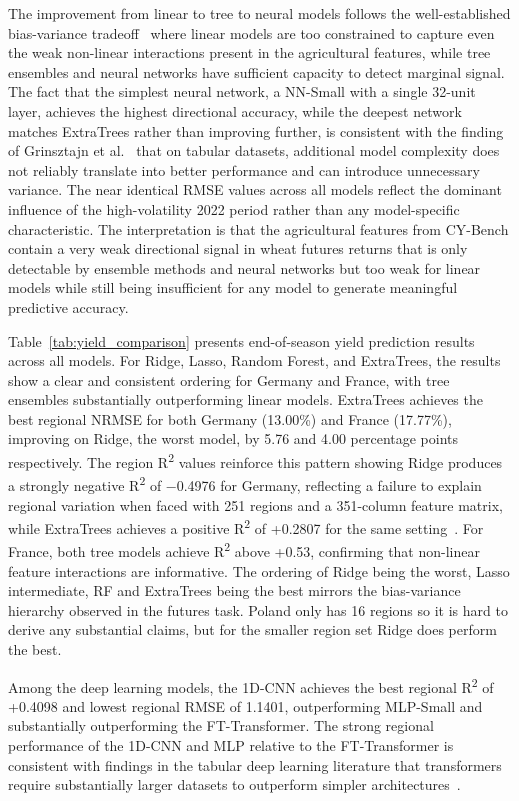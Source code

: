 \documentclass[pdflatex,sn-mathphys-num, oneside]{sn-jnl}%
\theoremstyle{thmstyleone}%
\theoremstyle{thmstyletwo}%
\theoremstyle{thmstylethree}%
\begin{document}
The improvement from linear to tree to neural models follows the well-established bias-variance tradeoff~\cite{bib32} where linear models are too constrained to capture even the weak non-linear interactions present in the agricultural features, while tree ensembles and neural networks have sufficient capacity to detect marginal signal. The fact that the simplest neural network, a NN-Small with a single 32-unit layer, achieves the highest directional accuracy, while the deepest network matches ExtraTrees rather than improving further, is consistent with the finding of Grinsztajn et al.~\cite{bib27} that on tabular datasets, additional model complexity does not reliably translate into better performance and can introduce unnecessary variance. The near identical RMSE values across all models reflect the dominant influence of the high-volatility 2022 period rather than any model-specific characteristic.
The interpretation is that the agricultural features from CY-Bench contain a very weak directional signal in wheat futures returns that is only detectable by ensemble methods and neural networks but too weak for linear models while still being insufficient for any model to generate meaningful predictive accuracy. 

Table~\ref{tab:yield_comparison} presents end-of-season yield prediction results across all models. For Ridge, Lasso, Random Forest, and ExtraTrees, the results show a clear and consistent ordering for Germany and France, with tree ensembles substantially outperforming linear models. ExtraTrees achieves the best regional NRMSE for both Germany (13.00\%) and France (17.77\%), improving on Ridge, the worst model, by 5.76 and 4.00 percentage points respectively. The region R\textsuperscript{2} values reinforce this pattern showing Ridge produces a strongly negative R\textsuperscript{2} of −0.4976 for Germany, reflecting a failure to explain regional variation when faced with 251 regions and a 351-column feature matrix, while ExtraTrees achieves a positive R\textsuperscript{2} of +0.2807 for the same setting~\cite{bib32}. For France, both tree models achieve R\textsuperscript{2} above +0.53, confirming that non-linear feature interactions are informative. The ordering of Ridge being the worst, Lasso intermediate, RF and ExtraTrees being the best mirrors the bias-variance hierarchy observed in the futures task. Poland only has 16 regions so it is hard to derive any substantial claims, but for the smaller region set Ridge does perform the best.

Among the deep learning models, the 1D-CNN achieves the best regional R\textsuperscript{2} of +0.4098 and lowest regional RMSE of 1.1401, outperforming MLP-Small and substantially outperforming the FT-Transformer. The strong regional performance of the 1D-CNN and MLP relative to the FT-Transformer is consistent with findings in the tabular deep learning literature that transformers require substantially larger datasets to outperform simpler architectures~\cite{bib27}. 
\end{document}
